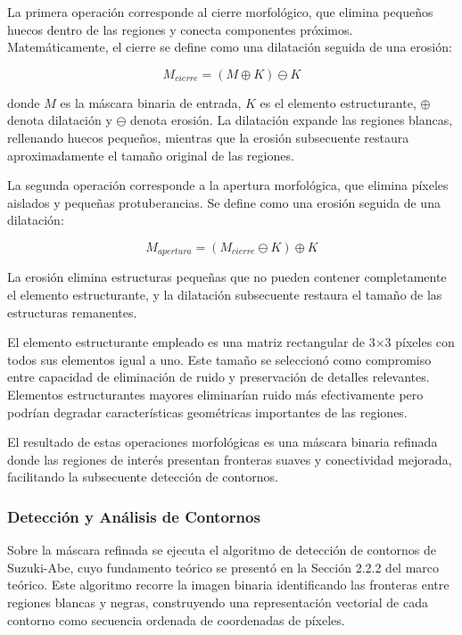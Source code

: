 La primera operación corresponde al cierre morfológico, que elimina pequeños huecos dentro de las regiones y conecta componentes próximos. Matemáticamente, el cierre se define como una dilatación seguida de una erosión:

\begin{equation}
M_{cierre} = (M \oplus K) \ominus K
\end{equation}

donde $M$ es la máscara binaria de entrada, $K$ es el elemento estructurante, $\oplus$ denota dilatación y $\ominus$ denota erosión. La dilatación expande las regiones blancas, rellenando huecos pequeños, mientras que la erosión subsecuente restaura aproximadamente el tamaño original de las regiones.

La segunda operación corresponde a la apertura morfológica, que elimina píxeles aislados y pequeñas protuberancias. Se define como una erosión seguida de una dilatación:

\begin{equation}
M_{apertura} = (M_{cierre} \ominus K) \oplus K
\end{equation}

La erosión elimina estructuras pequeñas que no pueden contener completamente el elemento estructurante, y la dilatación subsecuente restaura el tamaño de las estructuras remanentes.

El elemento estructurante empleado es una matriz rectangular de 3×3 píxeles con todos sus elementos igual a uno. Este tamaño se seleccionó como compromiso entre capacidad de eliminación de ruido y preservación de detalles relevantes. Elementos estructurantes mayores eliminarían ruido más efectivamente pero podrían degradar características geométricas importantes de las regiones.

El resultado de estas operaciones morfológicas es una máscara binaria refinada donde las regiones de interés presentan fronteras suaves y conectividad mejorada, facilitando la subsecuente detección de contornos.

\subsubsection{Detección y Análisis de Contornos}

Sobre la máscara refinada se ejecuta el algoritmo de detección de contornos de Suzuki-Abe, cuyo fundamento teórico se presentó en la Sección 2.2.2 del marco teórico. Este algoritmo recorre la imagen binaria identificando las fronteras entre regiones blancas y negras, construyendo una representación vectorial de cada contorno como secuencia ordenada de coordenadas de píxeles.

